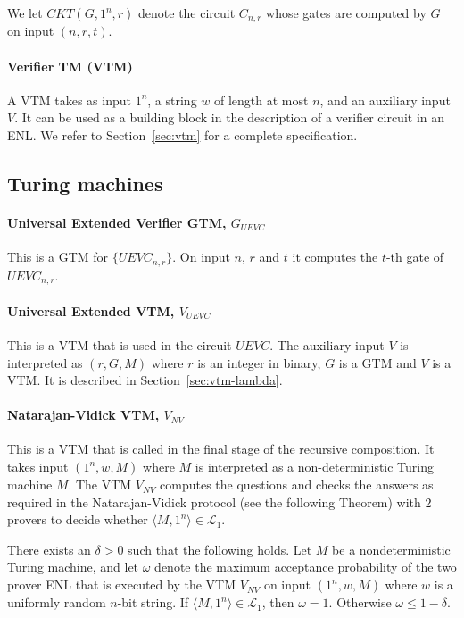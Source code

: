 \documentclass[11pt,letterpaper]{article}
\newcommand{\NEXP}{{\sf NEXP}}
\newcommand{\MIPstar}{{\sf MIP^*}}
\begin{document}
We let $CKT(G,1^n,r)$ denote the circuit $C_{n,r}$ whose gates are computed by $G$ on input $(n,r,t)$.

\paragraph{Verifier TM (VTM)} A VTM takes as input $1^n$, a string $w$ of length at most $n$, and an auxiliary input $V$. %
It can be used as a building block in the description of a verifier circuit in an ENL. We refer to Section~\ref{sec:vtm} for a complete specification. 

\subsection{Turing machines}

\paragraph{Universal Extended Verifier GTM, $G_{UEVC}$} This is a GTM for $\{UEVC_{n,r}\}$. On input $n$, $r$ and $t$ it computes the $t$-th gate of $UEVC_{n,r}$.

\paragraph{Universal Extended VTM, $V_{UEVC}$} This is a VTM that is used in the circuit $UEVC$. The auxiliary input $V$ is interpreted as $(r,G,M)$ where $r$ is an integer in binary, $G$ is a GTM and $V$ is a VTM. It is described in Section~\ref{sec:vtm-lambda}. 

\paragraph{Natarajan-Vidick VTM, $V_{NV}$} This is a VTM that is called in the final stage of the recursive composition. It takes input $(1^n,w,M)$ where $M$ is interpreted as a non-deterministic Turing machine $M$. The VTM $V_{NV}$ computes the questions and checks the answers as required in the Natarajan-Vidick protocol (see the following Theorem) with $2$ provers to decide whether $\langle M, 1^n \rangle \in \mathcal{L}_1$.

\begin{theorem}\label{thm:nv}
There exists an $\delta > 0$ such that the following holds. Let $M$ be a nondeterministic Turing machine, and let $\omega$ denote the maximum acceptance probability of the two prover ENL that is executed by the VTM $V_{NV}$ on input $(1^n,w,M)$ where $w$ is a uniformly random $n$-bit string. If $\langle M, 1^n \rangle \in \mathcal{L}_1$, then $\omega = 1$. Otherwise $\omega \leq 1 - \delta$. 
\end{theorem}
\end{document}
